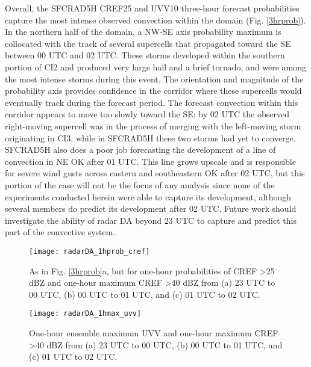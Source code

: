 Overall, the SFCRAD5H CREF25 and UVV10 three-hour forecast probabilities capture the most intense observed convection within the domain (Fig. \ref{3hrprob}). In the northern half of the domain, a NW-SE axis probability maximum is collocated with the track of several supercells that propagated toward the SE between 00 UTC and 02 UTC. These storms developed within the southern portion of CI2 and produced very large hail and a brief tornado, and were among the most intense storms during this event. The orientation and magnitude of the probability axis provides confidence in the corridor where these supercells would eventually track during the forecast period. The forecast convection within this corridor appears to move too slowly toward the SE; by 02 UTC the observed right-moving supercell was in the process of merging with the left-moving storm originating in CI3, while in SFCRAD5H these two storms had yet to converge. SFCRAD5H also does a poor job forecasting the development of a line of convection in NE OK after 01 UTC. This line grows upscale and is responsible for severe wind gusts across eastern and southeastern OK after 02 UTC, but this portion of the case will not be the focus of any analysis since none of the experiments conducted herein were able to capture its development, although several members do predict its development after 02 UTC. Future work should investigate the ability of radar DA beyond 23 UTC to capture and predict this part of the convective system.

\begin{figure}
\centering
\texttt{[image: radarDA\_1hprob\_cref]}
\caption{As in Fig. \ref{3hrprob}a, but for one-hour probabilities of CREF \textgreater 25 dBZ and one-hour maximum CREF \textgreater 40 dBZ from (a) 23 UTC to 00 UTC, (b) 00 UTC to 01 UTC, and (c) 01 UTC to 02 UTC.}
\label{1hprob_cref}
\end{figure}
\begin{figure}
\centering
\texttt{[image: radarDA\_1hmax\_uvv]}
\caption{One-hour ensemble maximum UVV and one-hour maximum CREF \textgreater 40 dBZ from (a) 23 UTC to 00 UTC, (b) 00 UTC to 01 UTC, and (c) 01 UTC to 02 UTC.}
\label{1hmax_uvv}
\end{figure}

